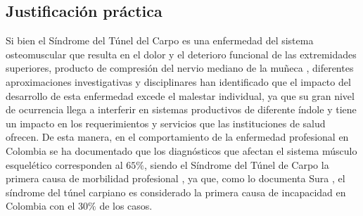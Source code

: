 \documentclass[a4paper,man,natbib]{apa6}
\begin{document}
\subsection{Justificación práctica}
Si bien el Síndrome del Túnel del Carpo es una enfermedad del sistema osteomuscular que resulta en el dolor y el deterioro funcional de las extremidades superiores, producto de compresión del nervio mediano de la muñeca \cite{v1}, diferentes aproximaciones investigativas y disciplinares han identificado que el impacto del desarrollo de esta enfermedad excede el malestar individual, ya que su gran nivel de ocurrencia llega a interferir en sistemas productivos de diferente índole y tiene un impacto en los requerimientos y servicios que las instituciones de salud ofrecen. De esta manera, en el comportamiento de la enfermedad  profesional en Colombia se ha documentado que los diagnósticos que afectan el sistema músculo esquelético corresponden al $65\%$, siendo el Síndrome del Túnel de Carpo la primera causa de morbilidad profesional \cite{v2}, ya que, como lo documenta Sura \cite{f2},  el síndrome del túnel carpiano es considerado la primera causa de incapacidad en Colombia con el $30\%$ de los casos.
\end{document}
